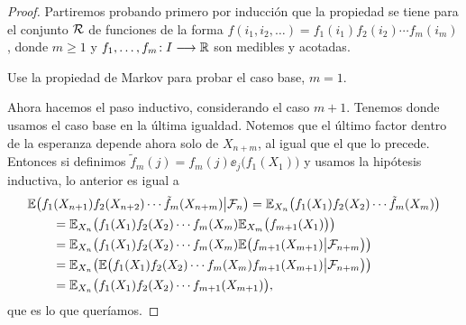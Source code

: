 \begin{proof}
Partiremos probando primero por inducción que la propiedad se tiene para el conjunto ${\cal R}$ de funciones de la forma $f(i_1,i_2,\dotsc)=f_1(i_1)f_2(i_2)\dotsm f_m(i_m)$, donde $m\geq1$ y $f_1,\dotsc,f_m\!:I\longrightarrow\mathbb{R}$ son medibles y acotadas.

\begin{exer}
Use la propiedad de Markov para probar el caso base, $m=1$.
\end{exer}

Ahora hacemos el paso inductivo, considerando el caso $m+1$.
Tenemos
donde usamos el caso base en la última igualdad.
Notemos que el último factor dentro de la esperanza depende ahora solo de $X_{n+m}$, al igual que el que lo precede.
Entonces si definimos $\tilde f_m(j)=f_m(j)\ee_{j}\big(f_1(X_1)\big)$ y usamos la hipótesis inductiva, lo anterior es igual a
\begin{align}
&\mathbb{E}\big(f_1(X_{n+1})f_2(X_{n+2})\dotsm \tilde f_{m}(X_{n+m})\big|\mathcal{F}_n\big)
=\mathbb{E}_{X_n}\big(f_1(X_{1})f_2(X_{2})\dotsm \tilde f_{m}(X_{m})\big)\\
&\qquad=\mathbb{E}_{X_n}\big(f_1(X_{1})f_2(X_{2})\dotsm f_{m}(X_{m})\mathbb{E}_{X_{m}}\big(f_{m+1}(X_1)\big)\big)\\
&\qquad=\mathbb{E}_{X_n}\big(f_1(X_{1})f_2(X_{2})\dotsm f_{m}(X_{m})\mathbb{E}\big(f_{m+1}(X_{m+1})\big|\mathcal{F}_{n+m}\big)\big)\\
&\qquad=\mathbb{E}_{X_n}\big(\mathbb{E}\big(f_1(X_{1})f_2(X_{2})\dotsm f_{m}(X_{m})f_{m+1}(X_{m+1})\big|\mathcal{F}_{n+m}\big)\big)\\
&\qquad=\mathbb{E}_{X_n}\big(f_1(X_{1})f_2(X_{2})\dotsm f_{m+1}(X_{m+1})\big),
\end{align}
que es lo que queríamos.


\end{proof}
